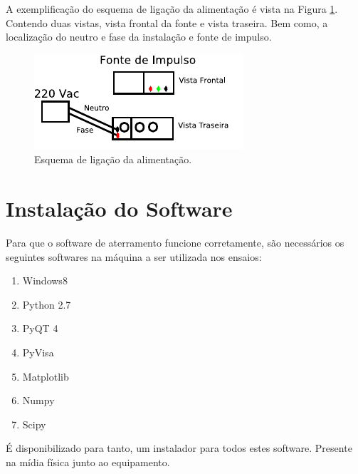 \documentclass[a4paper, 10pt]{article}
\begin{document}
A exemplificação do esquema de ligação da alimentação é vista 
na Figura \ref{fig_esquema_ligacao_alimentacao}. Contendo duas vistas, vista frontal da fonte e vista
traseira. Bem como, a localização do neutro e fase da instalação e fonte de impulso.

\begin{figure}[!h]
        \caption{\label{fig_esquema_ligacao_alimentacao} Esquema de ligação da alimentação.}
	    \begin{center}
            \includegraphics[scale=1.2]{../fotos/conexoes/alimentacao.pdf}
	    \end{center}
\end{figure}




\section{Instalação do Software}

Para que o software de aterramento funcione corretamente, 
são necessários os seguintes softwares na máquina a ser utilizada nos ensaios:

\begin{enumerate}
    \item Windows8
    \item Python 2.7
    \item PyQT 4
    \item PyVisa
    \item Matplotlib
    \item Numpy
    \item Scipy
\end{enumerate}

É disponibilizado para tanto, um instalador para todos estes software. Presente 
na mídia física junto ao equipamento. 
\end{document}
